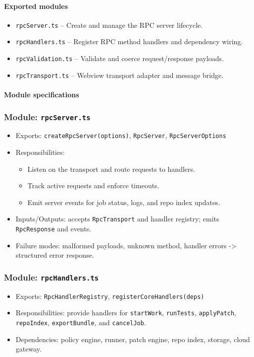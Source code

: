 \documentclass[11pt]{article}
\begin{document}
\paragraph{Exported modules}
\begin{itemize}[noitemsep]
  \item \texttt{rpcServer.ts} -- Create and manage the RPC server lifecycle.
  \item \texttt{rpcHandlers.ts} -- Register RPC method handlers and dependency wiring.
  \item \texttt{rpcValidation.ts} -- Validate and coerce request/response payloads.
  \item \texttt{rpcTransport.ts} -- Webview transport adapter and message bridge.
\end{itemize}

\paragraph{Module specifications}
\subsubsection*{Module: \texttt{rpcServer.ts}}
\begin{itemize}[noitemsep]
  \item Exports: \texttt{createRpcServer(options)}, \texttt{RpcServer}, \texttt{RpcServerOptions}
  \item Responsibilities:
    \begin{itemize}[noitemsep]
      \item Listen on the transport and route requests to handlers.
      \item Track active requests and enforce timeouts.
      \item Emit server events for job status, logs, and repo index updates.
    \end{itemize}
  \item Inputs/Outputs: accepts \texttt{RpcTransport} and handler registry; emits \texttt{RpcResponse} and events.
  \item Failure modes: malformed payloads, unknown method, handler errors -> structured error response.
\end{itemize}

\subsubsection*{Module: \texttt{rpcHandlers.ts}}
\begin{itemize}[noitemsep]
  \item Exports: \texttt{RpcHandlerRegistry}, \texttt{registerCoreHandlers(deps)}
  \item Responsibilities: provide handlers for \texttt{startWork}, \texttt{runTests}, \texttt{applyPatch},
        \texttt{repoIndex}, \texttt{exportBundle}, and \texttt{cancelJob}.
  \item Dependencies: policy engine, runner, patch engine, repo index, storage, cloud gateway.
\end{itemize}
\end{document}

